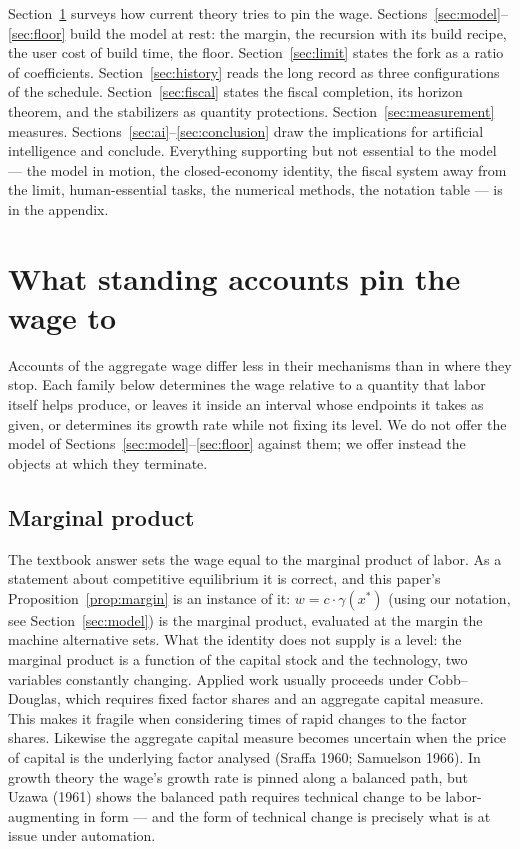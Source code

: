 \documentclass[12pt]{article}
\theoremstyle{plain}
\begin{document}
Section~\ref{sec:accounts} surveys how current theory tries to pin the wage. Sections~\ref{sec:model}--\ref{sec:floor} build the model at rest: the margin, the recursion with its build recipe, the user cost of build time, the floor. Section~\ref{sec:limit} states the fork as a ratio of coefficients. Section~\ref{sec:history} reads the long record as three configurations of the schedule. Section~\ref{sec:fiscal} states the fiscal completion, its horizon theorem, and the stabilizers as quantity protections. Section~\ref{sec:measurement} measures. Sections~\ref{sec:ai}--\ref{sec:conclusion} draw the implications for artificial intelligence and conclude. Everything supporting but not essential to the model --- the model in motion, the closed-economy identity, the fiscal system away from the limit, human-essential tasks, the numerical methods, the notation table --- is in the appendix.

\section{What standing accounts pin the wage to}\label{sec:accounts}

Accounts of the aggregate wage differ less in their mechanisms than in where they stop. Each family below determines the wage relative to a quantity that labor itself helps produce, or leaves it inside an interval whose endpoints it takes as given, or determines its growth rate while not fixing its level. We do not offer the model of Sections~\ref{sec:model}--\ref{sec:floor} against them; we offer instead the objects at which they terminate.

\subsection{Marginal product}\label{sec:marginal-product}

The textbook answer sets the wage equal to the marginal product of labor. As a statement about competitive equilibrium it is correct, and this paper's Proposition~\ref{prop:margin} is an instance of it: $w = c\cdot \gamma (x^*)$ (using our notation, see Section~\ref{sec:model}) is the marginal product, evaluated at the margin the machine alternative sets. What the identity does not supply is a level: the marginal product is a function of the capital stock and the technology, two variables constantly changing. Applied work usually proceeds under Cobb--Douglas, which requires fixed factor shares and an aggregate capital measure. This makes it fragile when considering times of rapid changes to the factor shares. Likewise the aggregate capital measure becomes uncertain when the price of capital is the underlying factor analysed (Sraffa 1960; Samuelson 1966). In growth theory the wage's growth rate is pinned along a balanced path, but Uzawa (1961) shows the balanced path requires technical change to be labor-augmenting in form --- and the form of technical change is precisely what is at issue under automation.
\end{document}
